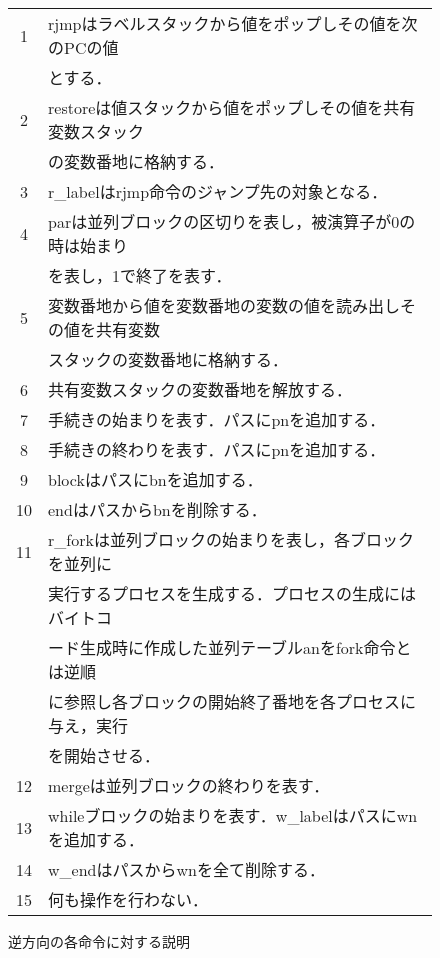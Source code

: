 \documentclass[submit,PRO]{ipsj}
\begin{document}
\begin{figure}[tb]
\caption{逆方向の各命令に対する説明}
\label{tab:expback}
\begin{center}
\begin{tabular}[t]{|c|l|}\hline
1 & rjmpはラベルスタックから値をポップしその値を次のPCの値\\ &とする．\\\hline

2 & restoreは値スタックから値をポップしその値を共有変数スタック\\ &の変数番地に格納する．\\\hline

3 & r\_labelはrjmp命令のジャンプ先の対象となる．\\\hline

4 & parは並列ブロックの区切りを表し，被演算子が0の時は始まり\\ &を表し，1で終了を表す．\\\hline

5 & 変数番地から値を変数番地の変数の値を読み出しその値を共有変数\\ &スタックの変数番地に格納する．\\\hline

6 & 共有変数スタックの変数番地を解放する．\\\hline

7 & 手続きの始まりを表す．パスにpnを追加する．\\\hline

8 & 手続きの終わりを表す．パスにpnを追加する．\\\hline

9 & blockはパスにbnを追加する．\\\hline

10 & endはパスからbnを削除する．\\\hline

11 & r\_forkは並列ブロックの始まりを表し，各ブロックを並列に\\ &実行するプロセスを生成する．プロセスの生成にはバイトコ\\ &ード生成時に作成した並列テーブルanをfork命令とは逆順\\ &に参照し各ブロックの開始終了番地を各プロセスに与え，実行\\ &を開始させる．\\\hline

12 & mergeは並列ブロックの終わりを表す．\\\hline

13 & whileブロックの始まりを表す．w\_labelはパスにwnを追加する．\\\hline

14 & w\_endはパスからwnを全て削除する．\\\hline

15 & 何も操作を行わない．\\\hline
\end{tabular}
\end{center}
\end{figure}
\end{document}
